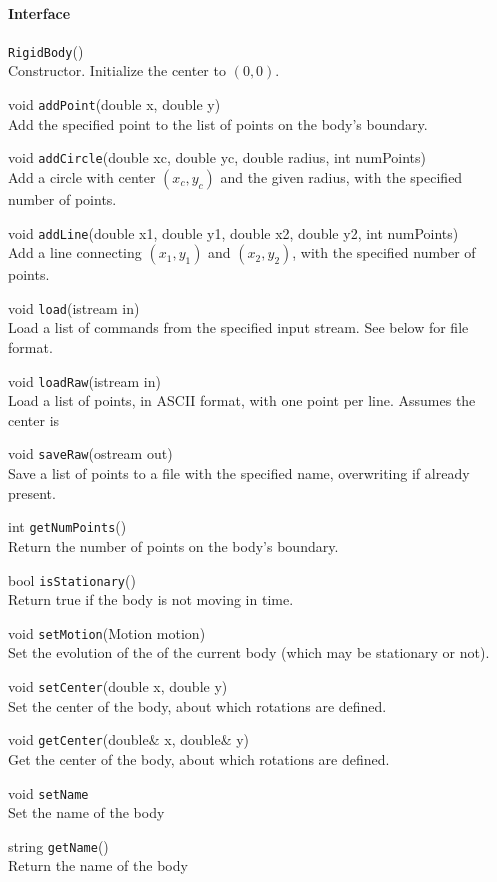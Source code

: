 \documentclass[11pt]{article}
\def\fn#1{{\tt #1}} %
\begin{document}
\paragraph{Interface}
\begin{description}
	\item \fn{RigidBody}() \\
		Constructor.  Initialize the center to $(0,0)$.
	\item void \fn{addPoint}(double x, double y) \\
		Add the specified point to the list of points on the body's boundary.
	\item void \fn{addCircle}(double xc, double yc, double radius, int numPoints) \\
		Add a circle with center $(x_c,y_c)$ and the given radius, with the specified number of points.
	\item void \fn{addLine}(double x1, double y1, double x2, double y2, int numPoints) \\
		Add a line connecting $(x_1,y_1)$ and $(x_2,y_2)$, with the specified number of points.
	\item void \fn{load}(istream in) \\
		Load a list of commands from the specified input stream.  See below for file format.
	\item void \fn{loadRaw}(istream in) \\
		Load a list of points, in ASCII format, with one point per line.  Assumes the center is 
	\item void \fn{saveRaw}(ostream out) \\
		Save a list of points to a file with the specified name, overwriting if already present.
	\item int \fn{getNumPoints}() \\
		Return the number of points on the body's boundary.
	\item bool \fn{isStationary}() \\
		Return true if the body is not moving in time.
	\item void \fn{setMotion}(Motion motion) \\
		Set the evolution of the of the current body (which may be stationary or not).
	\item void \fn{setCenter}(double x, double y) \\
		Set the center of the body, about which rotations are defined.
	\item void \fn{getCenter}(double\& x, double\& y)\\
		Get the center of the body, about which rotations are defined.
	\item void \fn{setName} \\
		Set the name of the body
	\item string \fn{getName}() \\
		Return the name of the body
	\item 
\end{description}
\end{document}
